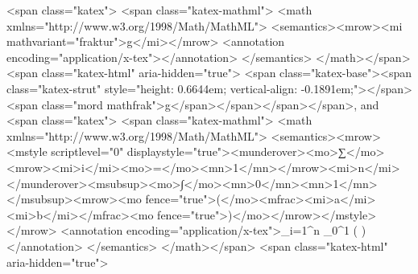 <span class="katex">
<span class="katex-mathml">
<math xmlns="http://www.w3.org/1998/Math/MathML">
<semantics><mrow><mi mathvariant="fraktur">g</mi></mrow>
<annotation encoding="application/x-tex"></annotation>
</semantics>
</math></span>
<span class="katex-html" aria-hidden="true">
<span class="katex-base"><span class="katex-strut" style="height: 0.6644em; vertical-align: -0.1891em;"></span><span class="mord mathfrak">g</span></span></span></span>, and 
<span class="katex">
<span class="katex-mathml">
<math xmlns="http://www.w3.org/1998/Math/MathML">
<semantics><mrow><mstyle scriptlevel="0" displaystyle="true"><munderover><mo>∑</mo><mrow><mi>i</mi><mo>=</mo><mn>1</mn></mrow><mi>n</mi></munderover><msubsup><mo>∫</mo><mn>0</mn><mn>1</mn></msubsup><mrow><mo fence="true">(</mo><mfrac><mi>a</mi><mi>b</mi></mfrac><mo fence="true">)</mo></mrow></mstyle></mrow>
<annotation encoding="application/x-tex">\displaystyle \sum_{i=1}^n \int_0^1 \left(  \right)</annotation>
</semantics>
</math></span>
<span class="katex-html" aria-hidden="true">
